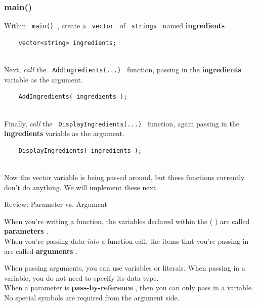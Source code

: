 \documentclass[a4paper,12pt]{book}
\begin{document}
                \hrulefill{}
                \subsubsection*{ main() }
    
                    Within \texttt{ main() }, create a
                    \texttt{ vector } of
                    \texttt{ strings } named
                    \textbf{ ingredients }

\begin{verbatim}
    vector<string> ingredients;
\end{verbatim}

                    ~\\ Next, \textit{ call } the \texttt{ AddIngredients(...) }
                    function, passing in the \textbf{ ingredients } variable
                    as the argument.
\begin{verbatim}
    AddIngredients( ingredients );
\end{verbatim}

                    ~\\ Finally, \textit{ call } the \texttt{ DisplayIngredients(...) }
                    function, again passing in the \textbf{ ingredients } variable
                    as the argument. 
\begin{verbatim}
    DisplayIngredients( ingredients );
\end{verbatim}

                    ~\\
                    Now the vector variable is being passed around, but
                    these functions currently don't do anything. We will
                    implement these next.

                    \begin{intro}{ Review: Parameter vs. Argument }

                    When you're writing a function, the
                    variables declared within the ( ) are
                    called \textbf{ parameters }. \\

                    When you're passing data \textit{ into }
                    a function call, the items that you're passing in are
                    called \textbf{ arguments }.

                    When passing arguments, you can use variables
                    or literals. When passing in a variable, you
                    do not need to specify its data type. \\

                    When a parameter is \textbf{ pass-by-reference },
                    then you can only pass in a variable. No special
                    symbols are required from the argument side. 
                    \end{intro}
\end{document}
